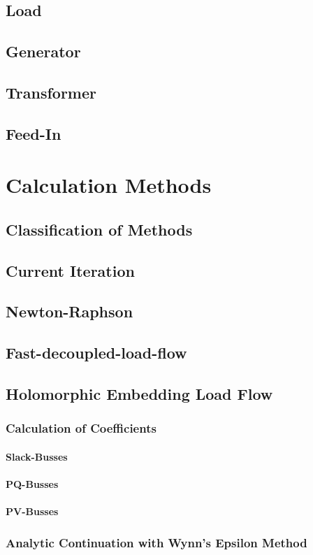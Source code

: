 \subsection{Load}

\subsection{Generator}

\subsection{Transformer}

\subsection{Feed-In}

\section{Calculation Methods}

\subsection{Classification of Methods}

\subsection{Current Iteration}
\label{sec:current_iteration}

\subsection{Newton-Raphson}
\label{sec:newton_raphson}

\subsection{Fast-decoupled-load-flow}
\label{sec:fdlf}

\subsection{Holomorphic Embedding Load Flow}
\label{sec:helm}

\subsubsection{Calculation of Coefficients}

\paragraph{Slack-Busses}

\paragraph{PQ-Busses}

\paragraph{PV-Busses}

\subsubsection{Analytic Continuation with Wynn's Epsilon Method}
